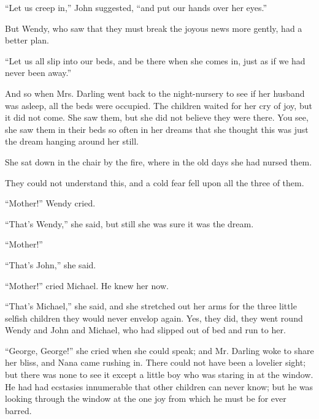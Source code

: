 ``Let us creep in,'' John suggested, ``and put our hands over her eyes.''

But Wendy, who saw that they must break the joyous news more gently,
had a better plan.

``Let us all slip into our beds, and be there when she comes in, just as
if we had never been away.''

And so when Mrs. Darling went back to the night-nursery to see if her
husband was asleep, all the beds were occupied. The children waited for
her cry of joy, but it did not come. She saw them, but she did not
believe they were there. You see, she saw them in their beds so often
in her dreams that she thought this was just the dream hanging around
her still.

She sat down in the chair by the fire, where in the old days she had
nursed them.

They could not understand this, and a cold fear fell upon all the three
of them.

``Mother!'' Wendy cried.

``That's Wendy,'' she said, but still she was sure it was the dream.

``Mother!''

``That's John,'' she said.

``Mother!'' cried Michael. He knew her now.

``That's Michael,'' she said, and she stretched out her arms for the
three little selfish children they would never envelop again. Yes, they
did, they went round Wendy and John and Michael, who had slipped out of
bed and run to her.

``George, George!'' she cried when she could speak; and Mr. Darling woke
to share her bliss, and Nana came rushing in. There could not have been
a lovelier sight; but there was none to see it except a little boy who
was staring in at the window. He had had ecstasies innumerable that
other children can never know; but he was looking through the window at
the one joy from which he must be for ever barred.